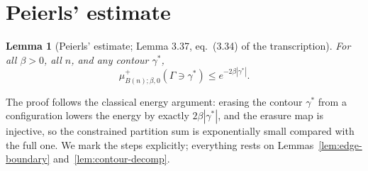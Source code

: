 \documentclass[11pt]{article}
\theoremstyle{plain}
\newtheorem{lemma}[theorem]{Lemma}
\theoremstyle{definition}
\theoremstyle{remark}
\newcommand{\Gam}{\Gamma}           %
\begin{document}
\section{Peierls' estimate}
\label{sec:peierls}

\begin{lemma}[Peierls' estimate; Lemma 3.37, eq.~(3.34) of the transcription]
\label{lem:peierls}
For all $\beta>0$, all $n$, and any contour $\gamma^*$,
\[
  \mu^{+}_{B(n);\beta,0}(\Gam\ni\gamma^*)\le e^{-2\beta|\gamma^*|}.
\]
\end{lemma}

\noindent
The proof follows the classical energy argument: erasing the contour
$\gamma^*$ from a configuration lowers the energy by exactly
$2\beta|\gamma^*|$, and the erasure map is injective, so the constrained
partition sum is exponentially small compared with the full one. We mark the
steps explicitly; everything rests on
Lemmas~\ref{lem:edge-boundary} and~\ref{lem:contour-decomp}.
\end{document}

